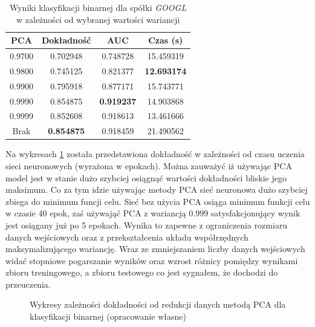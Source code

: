 \documentclass[a4paper, twoside, 11pt, openright]{article}
\begin{document}
\begin{table}[H]
    \centering
    \begin{tabular}{|c|c|c|c|}
    \hline
        \textbf{PCA} & \textbf{Dokładność} &  \textbf{AUC} &  \textbf{Czas (s)} \\ \hline
0.9700               &  0.702948 &  0.748728 &   15.459319 \\ \hline
0.9800               &  0.745125 &  0.821377 &   \textbf{12.693174} \\ \hline
0.9900               &  0.795918 &  0.877171 &   15.743771 \\ \hline
0.9990           &  0.854875 &  \textbf{0.919237} &   14.903868 \\ \hline
0.9999             &  0.852608 &  0.918613 &   13.461666 \\ \hline
Brak                &  \textbf{0.854875} &  0.918459 &   21.490562 \\ \hline

    \end{tabular}
    \caption{Wyniki klasyfikacji binarnej dla spółki \textit{GOOGL} w zależności od wybranej wartości wariancji}
    \label{tab:nn_pca_binary}
\end{table}

Na wykresach \ref{img:nn_pca_binary_vs_accuracy} została przedstawiona dokładność w zależności od czasu uczenia sieci neuronowych (wyrażona w epokach). Można zauważyć iż używając PCA model jest w stanie dużo szybciej osiągnąć wartości dokładności bliskie jego maksimum. Co za tym idzie używając metody PCA sieć neuronowa dużo szybciej zbiega do minimum funcji celu. Sieć bez użycia PCA osiąga minimum funkcji celu w czasie 40 epok, zaś używająć PCA z wariancją 0.999 satysfakcjonujący wynik jest osiągany już po 5 epokach. Wynika to zapewne z ograniczenia rozmiaru danych wejściowych oraz z przekształcenia układu współrzędnych maksymalizującego wariancję. Wraz ze zmniejszaniem liczby danych wejściowych widać stopniowe pogarszanie wyników oraz wzrost różnicy pomiędzy wynikami zbioru treningowego, a zbioru testowego co jest sygnałem, że dochodzi do przeuczenia.


\begin{figure}[H]%
\centering
{}%
\qquad
{}%
\qquad
{}%
\qquad
{}%

\caption{Wykresy zależności dokładności od redukcji danych metodą PCA dla klasyfikacji binarnej (opracowanie własne)}
\label{img:nn_pca_binary_vs_accuracy}
\end{figure}
\end{document}
